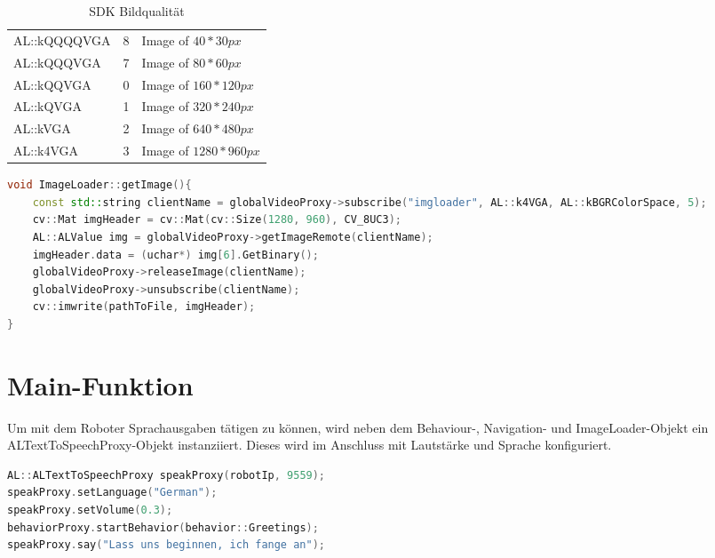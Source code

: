         \begin{table}[h]
            \caption{SDK Bildqualität}
            \label{tbl:qualities}
            \begin{center}
                \begin{tabular}[]{| l | l | l |}
                    AL::kQQQQVGA & 8 & Image of $40 * 30px$ \\
                    AL::kQQQVGA  & 7 & Image of $80 * 60px$ \\
                    AL::kQQVGA   & 0 & Image of $160 * 120px$ \\
                    AL::kQVGA    & 1 & Image of $320 * 240px$ \\
                    AL::kVGA     & 2 & Image of $640 * 480px$ \\
                    AL::k4VGA    & 3 & Image of $1280 * 960px$ \\
                \end{tabular}
            \end{center}
        \end{table}

\begin{lstlisting}[language=c++,
                   caption={Funktion: "`ImageLoader::getImage()''},
                   label={lst:imgget}]
void ImageLoader::getImage(){
    const std::string clientName = globalVideoProxy->subscribe("imgloader", AL::k4VGA, AL::kBGRColorSpace, 5);
    cv::Mat imgHeader = cv::Mat(cv::Size(1280, 960), CV_8UC3);
    AL::ALValue img = globalVideoProxy->getImageRemote(clientName);
    imgHeader.data = (uchar*) img[6].GetBinary();
    globalVideoProxy->releaseImage(clientName);
    globalVideoProxy->unsubscribe(clientName);
    cv::imwrite(pathToFile, imgHeader);
}
\end{lstlisting}

\chapter{Main-Funktion}

    Um mit dem Roboter Sprachausgaben tätigen zu können, wird neben dem
    Behaviour-, Navigation- und ImageLoader-Objekt ein
    ALTextToSpeechProxy-Objekt instanziiert.
    Dieses wird im Anschluss mit Lautstärke und Sprache konfiguriert.

\begin{lstlisting}[language=c++,
                   caption={Instanziierung ALTextToSpeechProxy},
                   label={lst:alttts}]
AL::ALTextToSpeechProxy speakProxy(robotIp, 9559);
speakProxy.setLanguage("German");
speakProxy.setVolume(0.3);
behaviorProxy.startBehavior(behavior::Greetings);
speakProxy.say("Lass uns beginnen, ich fange an");
\end{lstlisting}

